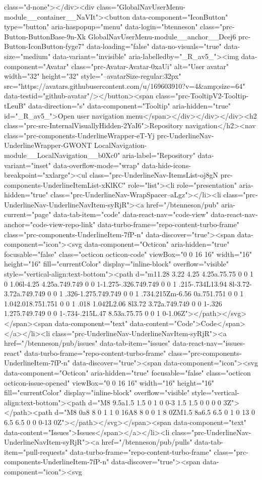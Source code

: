 {{{class="d-none"></div><div class="GlobalNavUserMenu-module__container__NaVIt"><button data-component="IconButton" type="button" aria-haspopup="menu" data-login="btenneson" class="prc-Button-ButtonBase-9n-Xk GlobalNavUserMenu-module__anchor__Dcej6 prc-Button-IconButton-fyge7" data-loading="false" data-no-visuals="true" data-size="medium" data-variant="invisible" aria-labelledby="_R_av5_"><img data-component="Avatar" class="prc-Avatar-Avatar-0xaUi" alt="User avatar" width="32" height="32" style="--avatarSize-regular:32px" src="https://avatars.githubusercontent.com/u/169603910?v=4&amp;size=64" data-testid="github-avatar"/></button><span class="prc-TooltipV2-Tooltip-tLeuB" data-direction="s" data-component="Tooltip" aria-hidden="true" id="_R_av5_">Open user navigation menu</span></div></div></div><h2 class="prc-src-InternalVisuallyHidden-2YaI6">Repository navigation</h2><nav class="prc-components-UnderlineWrapper-eT-Yj prc-UnderlineNav-UnderlineWrapper-GWONT LocalNavigation-module__LocalNavigation__b0Xc0" aria-label="Repository" data-variant="inset" data-overflow-mode="wrap" data-hide-icons-breakpoint="xxlarge"><ul class="prc-UnderlineNav-ItemsList-oj8gN prc-components-UnderlineItemList-xKlKC" role="list"><li role="presentation" aria-hidden="true" class="prc-UnderlineNav-WrapSpacer--aLgz"></li><li class="prc-UnderlineNav-UnderlineNavItem-syRjR"><a href="/btenneson/pub" aria-current="page" data-tab-item="code" data-react-nav="code-view" data-react-nav-anchor="code-view-repo-link" data-turbo-frame="repo-content-turbo-frame" class="prc-components-UnderlineItem-7fP-n" data-discover="true"><span data-component="icon"><svg data-component="Octicon" aria-hidden="true" focusable="false" class="octicon octicon-code" viewBox="0 0 16 16" width="16" height="16" fill="currentColor" display="inline-block" overflow="visible" style="vertical-align:text-bottom"><path d="m11.28 3.22 4.25 4.25a.75.75 0 0 1 0 1.06l-4.25 4.25a.749.749 0 0 1-1.275-.326.749.749 0 0 1 .215-.734L13.94 8l-3.72-3.72a.749.749 0 0 1 .326-1.275.749.749 0 0 1 .734.215Zm-6.56 0a.751.751 0 0 1 1.042.018.751.751 0 0 1 .018 1.042L2.06 8l3.72 3.72a.749.749 0 0 1-.326 1.275.749.749 0 0 1-.734-.215L.47 8.53a.75.75 0 0 1 0-1.06Z"></path></svg></span><span data-component="text" data-content="Code">Code</span></a></li><li class="prc-UnderlineNav-UnderlineNavItem-syRjR"><a href="/btenneson/pub/issues" data-tab-item="issues" data-react-nav="issues-react" data-turbo-frame="repo-content-turbo-frame" class="prc-components-UnderlineItem-7fP-n" data-discover="true"><span data-component="icon"><svg data-component="Octicon" aria-hidden="true" focusable="false" class="octicon octicon-issue-opened" viewBox="0 0 16 16" width="16" height="16" fill="currentColor" display="inline-block" overflow="visible" style="vertical-align:text-bottom"><path d="M8 9.5a1.5 1.5 0 1 0 0-3 1.5 1.5 0 0 0 0 3Z"></path><path d="M8 0a8 8 0 1 1 0 16A8 8 0 0 1 8 0ZM1.5 8a6.5 6.5 0 1 0 13 0 6.5 6.5 0 0 0-13 0Z"></path></svg></span><span data-component="text" data-content="Issues">Issues</span></a></li><li class="prc-UnderlineNav-UnderlineNavItem-syRjR"><a href="/btenneson/pub/pulls" data-tab-item="pull-requests" data-turbo-frame="repo-content-turbo-frame" class="prc-components-UnderlineItem-7fP-n" data-discover="true"><span data-component="icon"><svg }}}
